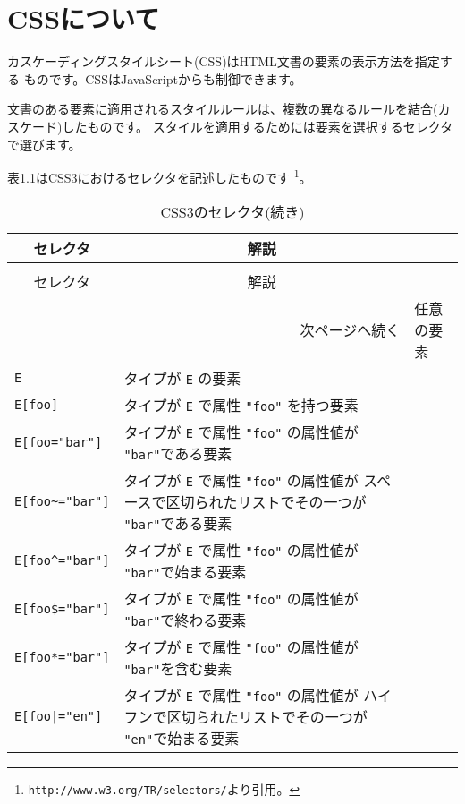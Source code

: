 \chapter{CSSについて}
カスケーディングスタイルシート(CSS)はHTML文書の要素の表示方法を指定する
ものです。CSSはJavaScriptからも制御できます。

文書のある要素に適用されるスタイルルールは、複数の異なるルールを結合(カ
スケード)したものです。
スタイルを適用するためには要素を選択するセレクタで選びます。

表\ref{CSS3selector}はCSS3におけるセレクタを記述したものです
\footnote{\protect\texttt{http://www.w3.org/TR/selectors/}より引用。}。
\begin{longtable}{|m{13em}|m{}|}
 \caption{CSS3のセレクタ}\label{CSS3selector}\\
\hline
\multicolumn{1}{|c|}{セレクタ}&\multicolumn{1}{c|}{解説}\\\hline
\endfirsthead
 \caption{CSS3のセレクタ(続き)}\\
\hline
\multicolumn{1}{|c|}{セレクタ}&\multicolumn{1}{c|}{解説}\\\hline
\endhead
\multicolumn{2}{r}{次ページへ続く}
\endfoot
\hline
\endlastfoot
\verb+*+&任意の要素%
\\\hline
\verb+E+&タイプが \verb+E+ の要素%
\\\hline
\verb+E[foo]+&タイプが \verb+E+ で属性 \verb+"foo"+ を持つ要素%
\\\hline
\verb+E[foo="bar"]+&タイプが \verb+E+ で属性 \verb+"foo"+ の属性値が
     \verb+"bar"+である要素%
\\\hline
\verb+E[foo~="bar"]+&タイプが \verb+E+ で属性 \verb+"foo"+ の属性値が
     スペースで区切られたリストでその一つが \verb+"bar"+である要素%
\\\hline
\verb+E[foo^="bar"]+&タイプが \verb+E+ で属性 \verb+"foo"+ の属性値が
     \verb+"bar"+で始まる要素
\\\hline
\verb+E[foo$="bar"]+&タイプが \verb+E+ で属性 \verb+"foo"+ の属性値が
     \verb+"bar"+で終わる要素%
\\\hline
\verb+E[foo*="bar"]+&タイプが \verb+E+ で属性 \verb+"foo"+ の属性値が
     \verb+"bar"+を含む要素%
\\\hline
\verb+E[foo|="en"]+&タイプが \verb+E+ で属性 \verb+"foo"+ の属性値が
     ハイフンで区切られたリストでその一つが \verb+"en"+で始まる要素

\end{longtable}
